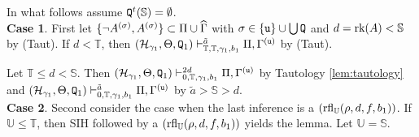 \documentclass{article}
\newcommand{\mS}{\mathbb{S}}
\newcommand{\mT}{\mathbb{T}}
\newcommand{\mU}{\mathbb{U}}
\begin{document}
 
In what follows assume ${\tt Q}^{t}(\mS)=\emptyset$. 
\\
\textbf{Case 1}.
First let $\{\lnot A^{(\sigma)},A^{(\sigma)}\}\subset\Pi\cup\widehat{\Gamma}$ with $\sigma\in\{{\tt u}\}\cup\bigcup{\tt Q}$ and
$d=\rk(A)<\mS$ by (Taut).
If $d<\mT$, then 
$(\mathcal{H}_{\gam_{1}},\Theta, {\tt Q}_{1})\vdash^{\tilde{a}}_{\mT,\mT,\gam_{1},b_{1}}\Pi,\Gamma^{({\tt u})}$
by (Taut).

Let $\mT\leq d<\mS$.
Then
$(\calh_{\gam_{1}},\Tht,{\tt Q}_{1})\vdash^{2d}_{0,\mT,\gam_{1},b_{1}}\Pi,\Gamma^{({\tt u})}$ by Tautology \ref{lem:tautology} and
$(\calh_{\gam_{1}},\Tht,{\tt Q}_{1})\vdash^{\tilde{a}}_{0,\mT,\gam_{1},b_{1}}\Pi,\Gamma^{({\tt u})}$
by $\tilde{a}>\mS>d$.
\\
\textbf{Case 2}.
Second consider the case when the last inference is a $({\rm rfl}_{\mU}(\rho,d,f,b_{1}))$.
If $\mU\leq\mT$, then SIH followed by a $({\rm rfl}_{\mU}(\rho,d,f,b_{1}))$ yields the lemma.
Let $\mU=\mS$.
\end{document}
